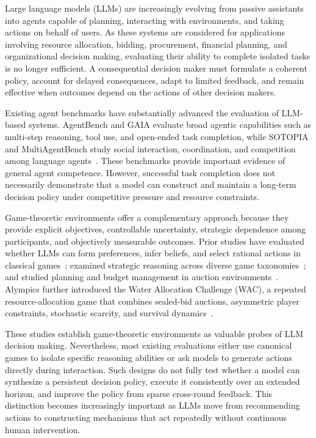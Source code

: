 \documentclass[letterpaper]{article} %
\begin{document}
Large language models (LLMs) are increasingly evolving from passive assistants into agents capable of planning, interacting with environments, and taking actions on behalf of users. As these systems are considered for applications involving resource allocation, bidding, procurement, financial planning, and organizational decision making, evaluating their ability to complete isolated tasks is no longer sufficient. A consequential decision maker must formulate a coherent policy, account for delayed consequences, adapt to limited feedback, and remain effective when outcomes depend on the actions of other decision makers.

Existing agent benchmarks have substantially advanced the evaluation of LLM-based systems. AgentBench and GAIA evaluate broad agentic capabilities such as multi-step reasoning, tool use, and open-ended task completion, while SOTOPIA and MultiAgentBench study social interaction, coordination, and competition among language agents~\cite{liu2023agentbench,mialon2023gaia,zhou2024sotopia,zhu2025multiagentbench}. These benchmarks provide important evidence of general agent competence. However, successful task completion does not necessarily demonstrate that a model can construct and maintain a long-term decision policy under competitive pressure and resource constraints.

Game-theoretic environments offer a complementary approach because they provide explicit objectives, controllable uncertainty, strategic dependence among participants, and objectively measurable outcomes. Prior studies have evaluated whether LLMs can form preferences, infer beliefs, and select rational actions in classical games~\cite{fan2024rational}; examined strategic reasoning across diverse game taxonomies~\cite{duan2024gtbench,huang2025gamabench}; and studied planning and budget management in auction environments~\cite{chen2023aucarena}. Alympics further introduced the Water Allocation Challenge (WAC), a repeated resource-allocation game that combines sealed-bid auctions, asymmetric player constraints, stochastic scarcity, and survival dynamics~\cite{mao2025alympics}.

These studies establish game-theoretic environments as valuable probes of LLM decision making. Nevertheless, most existing evaluations either use canonical games to isolate specific reasoning abilities or ask models to generate actions directly during interaction. Such designs do not fully test whether a model can synthesize a persistent decision policy, execute it consistently over an extended horizon, and improve the policy from sparse cross-round feedback. This distinction becomes increasingly important as LLMs move from recommending actions to constructing mechanisms that act repeatedly without continuous human intervention.
\end{document}
